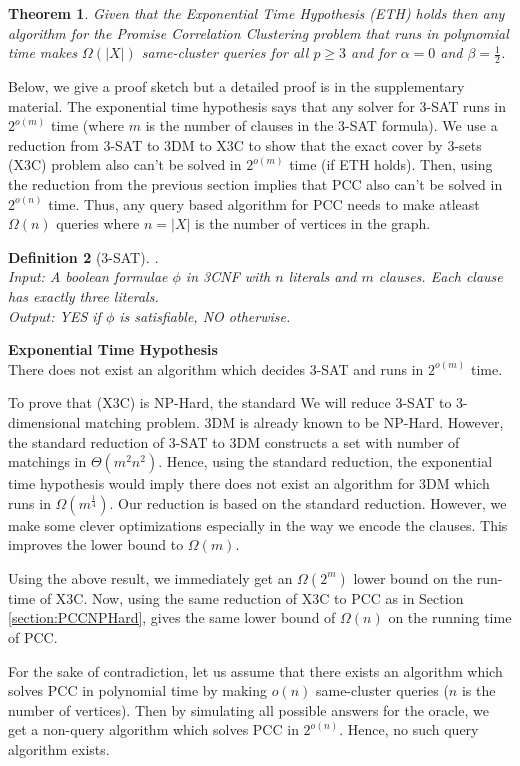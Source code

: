 \documentclass[12pt]{article}
\newtheorem{theorem}{Theorem}
\newtheorem{definition}[theorem]{Definition}
\begin{document}
\begin{theorem}
Given that the Exponential Time Hypothesis (ETH) holds then any algorithm for the Promise Correlation Clustering problem  that runs in polynomial time makes $\Omega(|X|)$ same-cluster queries for all $p \ge 3$ and for $\alpha = 0$ and $\beta = \frac{1}{2}$. 
\end{theorem}

\noindent Below, we give a proof sketch but a detailed proof is in the supplementary material. The exponential time hypothesis says that any solver for $3$-SAT runs in $2^{o(m)}$ time (where $m$ is the number of clauses in the $3$-SAT formula). We use a reduction from $3$-SAT to 3DM to X3C to show that the exact cover by 3-sets (X3C) problem also can't be solved in $2^{o(m)}$ time (if ETH holds). Then, using the reduction from the previous section implies that PCC also can't be solved in $2^{o(n)}$ time. Thus, any query based algorithm for PCC needs to make atleast $\Omega(n)$ queries where $n = |X|$ is the number of vertices in the graph. 

\begin{definition}[3-SAT].\\
Input: A boolean formulae $\phi$ in 3CNF with $n$ literals and $m$ clauses. Each clause has exactly three literals. \\
Output: YES if $\phi$ is satisfiable, NO otherwise. 
\end{definition}

\noindent\textbf{Exponential Time Hypothesis}\\
There does not exist an algorithm which decides 3-SAT  and runs in $2^{o(m)}$ time.

\noindent To prove that (X3C) is NP-Hard, the standard We will reduce 3-SAT to 3-dimensional matching problem. 3DM is already known to be NP-Hard. However, the standard reduction of 3-SAT to 3DM constructs a set with number of matchings in $\Theta(m^2 n^2)$. Hence, using the standard reduction, the exponential time hypothesis would imply there does not exist an algorithm for 3DM which runs in $\Omega(m^\frac{1}{4})$. Our reduction is based on the standard reduction. However, we make some clever optimizations especially in the way we encode the clauses. This improves the lower bound to $\Omega(m)$.

Using the above result, we immediately get an $\Omega(2^m)$ lower bound on the run-time of X3C. Now, using the same reduction of X3C to PCC as in Section \ref{section:PCCNPHard}, gives the same lower bound of $\Omega(n)$ on the running time of PCC. 

For the sake of contradiction, let us assume that there exists an algorithm which solves PCC in polynomial time by making $o(n)$ same-cluster queries ($n$ is the number of vertices). Then by simulating all possible answers for the oracle, we get a non-query algorithm which solves PCC in $2^{o(n)}$. Hence, no such query algorithm exists. 

\ifdefined\COMPLETE
\else
\end{document}
